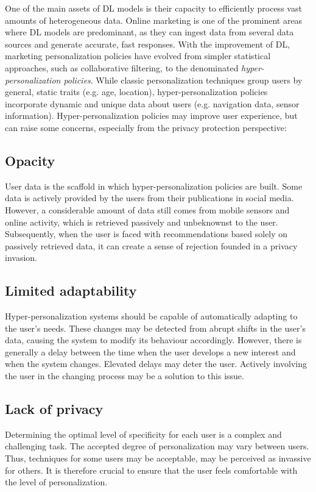 One of the main assets of DL models is their capacity to efficiently process vast amounts of heterogeneous data. Online marketing is one of the prominent areas where DL models are predominant, as they can ingest data from several data sources and generate accurate, fast responses. With the improvement of DL, marketing personalization policies have evolved from simpler statistical approaches, such as collaborative filtering, to the denominated \textit{hyper-personalization policies}. While classic personalization techniques group users by general, static traits (e.g. age, location), hyper-personalization policies incorporate dynamic and unique data about users (e.g. navigation data, sensor information). Hyper-personalization policies may improve user experience, but can raise some concerns, especially from the privacy protection perspective:

\subsection*{Opacity}
User data is the scaffold in which hyper-personalization policies are built. Some data is actively provided by the users from their publications in social media. However, a considerable amount of data still comes from mobile sensors and online activity, which is retrieved passively and unbeknownst to the user. Subsequently, when the user is faced with recommendations based solely on passively retrieved data, it can create a sense of rejection founded in a privacy invasion.

\subsection*{Limited adaptability} 
Hyper-personalization systems should be capable of automatically adapting to the user's needs. These changes may be detected from abrupt shifts in the user's data, causing the system to modify its behaviour accordingly. However, there is generally a delay between the time when the user develops a new interest and when the system changes. Elevated delays may deter the user. Actively involving the user in the changing process may be a solution to this issue.

\subsection*{Lack of privacy}
Determining the optimal level of specificity for each user is a complex and challenging task. The accepted degree of personalization may vary between users. Thus, techniques for some users may be acceptable, may be perceived as invassive for others. It is therefore crucial to ensure that the user feels comfortable with the level of personalization.

